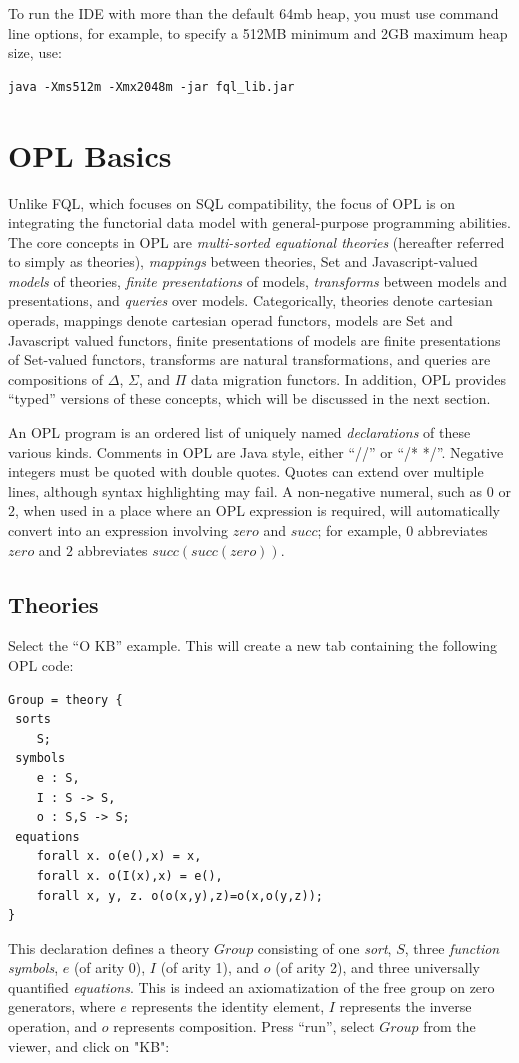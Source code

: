 \documentclass[12pt]{article}
\begin{document}
To run the IDE with more than the default 64mb heap, you must use command line options, for example, to specify a 512MB minimum and 2GB maximum heap size, use:
\begin{verbatim}
java -Xms512m -Xmx2048m -jar fql_lib.jar
\end{verbatim}

\newpage

\section{OPL Basics}

Unlike FQL, which focuses on SQL compatibility, the focus of OPL is on integrating the functorial data model with general-purpose programming abilities.  The core concepts in OPL are {\it multi-sorted equational theories} (hereafter referred to simply as theories), {\it mappings} between theories, Set and Javascript-valued {\it models} of theories, {\it finite presentations} of models, {\it transforms} between models and presentations, and {\it queries} over models.  Categorically, theories denote cartesian operads, mappings denote cartesian operad functors, models are Set and Javascript valued functors, finite presentations of models are finite presentations of Set-valued functors, transforms are natural transformations, and queries are compositions of $\Delta$, $\Sigma$, and $\Pi$ data migration functors.  In addition, OPL provides ``typed'' versions of these concepts, which will be discussed in the next section. 
 
An OPL program is an ordered list of uniquely named {\it declarations} of these various kinds.  Comments in OPL are Java style, either ``//'' or ``/* */''. Negative integers must be quoted with double quotes.  Quotes can extend over multiple lines, although syntax highlighting may fail.  A non-negative numeral, such as $0$ or $2$, when used in a place where an OPL expression is required, will automatically convert into an expression involving $zero$ and $succ$; for example, $0$ abbreviates $zero$ and $2$ abbreviates $succ(succ(zero))$.

\subsection{Theories}

Select the ``O KB'' example.  This will create a new tab containing the following OPL code:
\begin{verbatim}
Group = theory {
 sorts 
	S;
 symbols
	e : S,
	I : S -> S,
	o : S,S -> S;
 equations
	forall x. o(e(),x) = x,
	forall x. o(I(x),x) = e(),
	forall x, y, z. o(o(x,y),z)=o(x,o(y,z));
}
\end{verbatim}
This declaration defines a theory $Group$ consisting of one {\it sort}, $S$, three {\it function symbols}, $e$ (of arity 0), $I$ (of arity 1), and $o$ (of arity 2), and three universally quantified {\it equations}.  This is indeed an axiomatization of the free group on zero generators, where $e$ represents the identity element, $I$ represents the inverse operation, and $o$ represents composition.  Press ``run'', select $Group$ from the viewer, and click on "KB":
\end{document}
